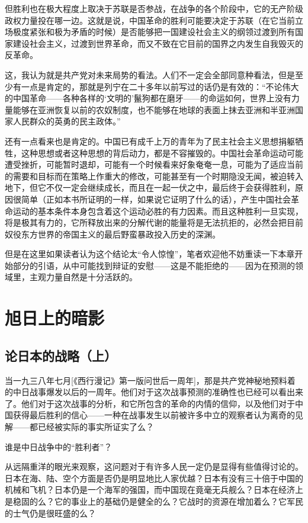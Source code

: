 \documentclass[10pt]{book}
\begin{document}
但胜利也在极大程度上取决于苏联是否参战，在战争的各个阶段中，它的无产阶级政权力量投在哪一边。这就是说，中国革命的胜利可能要决定于苏联（在它当前立场极度紧张和极为矛盾的时候）是否能够把一国建设社会主义的纲领过渡到所有国家建设社会主义，过渡到世界革命，而又不致在它目前的国界之内发生自我毁灭的反革命。

这，我认为就是共产党对未来局势的看法。人们不一定会全部同意种看法，但是至少有一点是肯定的，那就是列宁在二十多年以前写过的话仍是有效的：“不论伟大的中国革命——各种各样的‘文明的’鬣狗都在磨牙——的命运如何，世界上没有力量能够在亚洲恢复以前的农奴制度，也不能够在地球的表面上抹去亚洲和半亚洲国家人民群众的英勇的民主政体。”

还有一点看来也是肯定的。中国已有成千上万的青年为了民主社会主义思想捐躯牺牲，这种思想或者这种思想的背后动力，都是不容摧毁的。中国社会革命运动可能遭受挫折，可能暂时退却，可能有一个时候看来好象奄奄一息，可能为了适应当前的需要和目标而在策略上作重大的修改，可能甚至有一个时期隐没无闻，被迫转入地下，但它不仅一定会继续成长，而且在一起一伏之中，最后终于会获得胜利，原因很简单（正如本书所证明的一样，如果说它证明了什么的话），产生中国社会革命运动的基本条件本身包含着这个运动必胜的有力因素。而且这种胜利一旦实现，将是极其有力的，它所释放出来的分解代谢的能量将是无法抗拒的，必然会把目前奴役东方世界的帝国主义的最后野蛮暴政投入历史的深渊。

但是在这里如果读者认为这个结论太“令人惊惶”，笔者欢迎他不妨重读一下本章开始部分的引语，从中可能找到辩证的安慰——这是不能拒绝的——因为在预测的领域里，主观力量自然是十分活跃的。



\chapter{旭日上的暗影}

\section{论日本的战略（上）}

当一九三八年七月[《西行漫记》第一版问世后一周年]，那是共产党神秘地预料着的中日战事爆发以后的一周年。他们对于这次战事预测的准确性也已经可以看出来了。他们对于这次战事的分析，和它所包含的革命的内情的信仰，以及他们对于中国获得最后胜利的信心——一种在战事发生以前被许多中立的观察者认为离奇的见解——都已经被实际的事实所证实了么？

谁是中日战争中的“胜利者”？

从远隔重洋的眼光来观察，这问题对于有许多人民一定仍是显得有些值得讨论的。日本在海、陆、空个方面是否仍是明显地比人家优越？日本有没有三十倍于中国的机械和飞机？日本仍是一个海军的强国，而中国现在竟毫无兵舰么？日本在经济上是稳固的么？它的事业上的基础仍是健全的么？它战时的资源在增加着么？它军民的士气仍是很旺盛的么？
\end{document}

